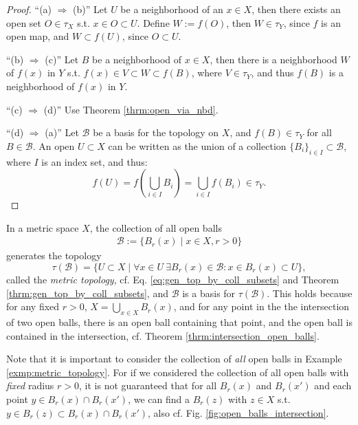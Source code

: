 \begin{proof}
	\enquote{(a) $\Rightarrow$ (b)} Let $U$ be a neighborhood of an $x\in X$, then there exists an open set $O\in \tau_X$ s.t. $x\in O\subset U$. Define $W := f(O)$, then $W\in \tau_Y$, since $f$ is an open map, and $W\subset f(U)$, since $O\subset U$.
	
	\enquote{(b) $\Rightarrow$ (c)} Let $B$ be a neighborhood of $x\in X$, then there is a neighborhood $W$ of $f(x)$ in $Y$ s.t. $f(x)\in V\subset W\subset f(B)$, where $V\in \tau_Y$, and thus $f(B)$ is a neighborhood of $f(x)$ in $Y$.
	
	\enquote{(c) $\Rightarrow$ (d)} Use Theorem \ref{thrm:open_via_nbd}. 
	
	\enquote{(d) $\Rightarrow$ (a)} Let $\mathscr B$ be a basis for the topology on $X$, and $f(B)\in \tau_Y$ for all $B\in\mathscr B$. An open $U\subset X$ can be written as the union of a collection $\{B_i\}_{i\in I}\subset \mathscr B$, where $I$ is an index set, and thus:
	$$f(U) = f\left(\bigcup_{i\in I}B_i\right) = \bigcup_{i\in I}f(B_i) \in \tau_Y.$$
\end{proof} 

\begin{exmp}\label{exmp:metric_topology}
	In a metric space $X$, the collection of all open balls 
	\begin{align}\label{eq:bases_open_ball_metric_spaces}
		\mathscr B := \{ B_{r}(x) \mid x\in X, r > 0 \}
	\end{align} 
	generates the topology $$\tau(\mathscr B) = \{U\subset X\mid \forall x\in U\ \exists B_{r}(x)\in\mathscr B: x\in B_{r}(x)\subset U\},$$
	called the \textit{metric topology}, cf. Eq. \eqref{eq:gen_top_by_coll_subsets} and Theorem \ref{thrm:gen_top_by_coll_subsets}, and $\mathscr B$ is a basis for $\tau(\mathscr B)$. This holds because for any fixed $r > 0$, $X = \bigcup_{x\in X}B_{r}(x)$, and for any point in the the intersection of two open balls, there is an open ball containing that point, and the open ball is contained in the intersection, cf. Theorem \ref{thrm:intersection_open_balls}.
\end{exmp}

\begin{remark}
	Note that it is important to consider the collection of \textit{all} open balls in Example \ref{exmp:metric_topology}. For if we considered the collection of all open balls with \textit{fixed} radius $r > 0$, it is not guaranteed that for all $B_{r}(x)$ and $B_{r}(x')$ and each point $y\in B_{r}(x)\cap B_{r}(x')$, we can find a $B_{r}(z)$ with $z\in X$ s.t. $y\in B_{r}(z)\subset B_{r}(x)\cap B_{r}(x')$, also cf. Fig. \ref{fig:open_balls_intersection}.
\end{remark}

